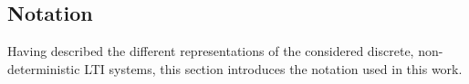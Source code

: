 
\subsection{Notation}
Having described the different representations of the considered discrete, non-deterministic \ac{LTI} systems, this section introduces the notation used in this work.

